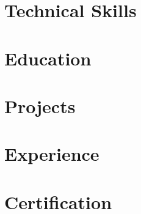 \documentclass[letter,11pt]{article}
\begin{document}
\section{Technical Skills}


\section{Education}


\section{Projects}


\section{Experience}


\section{Certification}

\end{document}
